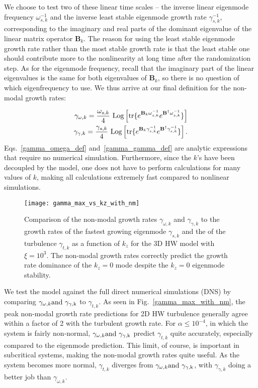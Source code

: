 \documentclass[twocolumn,showkeys,superscriptaddress]{revtex4}
\def\beqar{\begin{eqnarray}}
\def\eeqar{\end{eqnarray}}
\begin{document}
We choose to test two of these linear time scales -- the inverse linear eigenmode frequency $\omega_{s,k}^{-1}$ and the inverse least stable eigenmode growth rate $\gamma_{s,k}^{-1}$, corresponding to the imaginary and real parts
of the dominant eigenvalue of the linear matrix operator $\mathbf{B}_k$.
The reason for using the least stable eigenmode growth rate rather than the most stable growth rate is that the least stable one should contribute more to the nonlinearity at long time after the randomization step.
As for the eigenmode frequency, recall that the imaginary part of the linear eigenvalues is the same for both eigenvalues of $\mathbf{B}_k$, so there is no question of which eigenfrequency to use. 
We thus arrive at our final definition for the non-modal growth rates:

\beqar
\label{gamma_omega_def}
\gamma_{\omega,k} = \frac{\omega_{s,k}}{4} \ {\rm{Log}} \left[ {\rm{tr}} \{ e^{\mathbf{B}_k \omega_{s,k}^{-1}} e^{\mathbf{B}^{\dagger} \omega_{s,k}^{-1}} \} \right] \\
\label{gamma_gamma_def}
\gamma_{\gamma,k} = \frac{\gamma_{s,k}}{4} \ {\rm{Log}} \left[ {\rm{tr}} \{ e^{\mathbf{B}_k \gamma_{s,k}^{-1}} e^{\mathbf{B}^{\dagger} \gamma_{s,k}^{-1}} \} \right].
\eeqar
Eqs.~\ref{gamma_omega_def} and~\ref{gamma_gamma_def} are analytic expressions that require no numerical simulation. 
Furthermore, since the $k$'s have been decoupled by the model, one does not have to perform calculations for many values of $k$, making all calculations extremely fast compared to nonlinear simulations.

\begin{figure}
\centerline{\texttt{[image: gamma\_max\_vs\_kz\_with\_nm]}}
\caption{Comparison of the non-modal growth rates $\gamma_{\omega,k}$ and $\gamma_{\gamma,k}$ to the growth rates of the fastest growing eigenmode $\gamma_{s,k}$ 
and the of the turbulence $\gamma_{t,k}$ as a function of $k_z$ for the 3D HW model with $\xi = 10^3$. The non-modal growth rates correctly predict the growth rate dominance of the $k_z=0$ mode
despite the $k_z=0$ eigenmode stability.}
\label{gamma_max_vs_kz_with_nm}
\end{figure}

We test the model against the full direct numerical simulations (DNS) by comparing $\gamma_{\omega,k} \rm{and} \ \gamma_{\gamma,k}$ to $\gamma_{t,k}$. 
As seen in Fig.~\ref{gamma_max_with_nm}, the peak non-modal growth rate predictions for 2D HW turbulence generally agree within a factor of 2 with the turbulent growth rate. For $\alpha \le 10^{-4}$,
in which the system is fairly non-normal, $\gamma_{\omega,k} \rm{and} \ \gamma_{\gamma,k}$ predict $\gamma_{t,k}$ quite accurately, especially compared to the eigenmode prediction. 
This limit, of course, is important in subcritical systems, making the non-modal growth rates quite useful.
As the system becomes more normal, $\gamma_{t,k}$ diverges from $\gamma_{\omega,k} \rm{and} \ \gamma_{\gamma,k}$, with $\gamma_{\gamma,k}$ doing a better job than $\gamma_{\omega,k}$.
\end{document}
